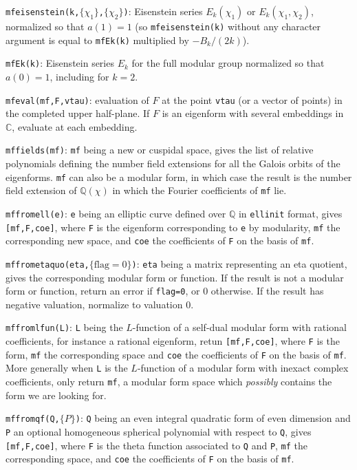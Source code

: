 \documentclass[11pt]{article}
\newcommand{\Q}{{\mathbb Q}}
\newcommand{\C}{{\mathbb C}}
\def\kbd#1{{\tt #1}}
\begin{document}
\f\kbd{mfeisenstein(k,$\{\chi_1\}$,$\{\chi_2\}$)}: Eisenstein series
$E_k(\chi_1)$ or
$E_k(\chi_1,\chi_2)$, normalized so that $a(1)=1$ (so \kbd{mfeisenstein(k)}
without any character argument is equal to \kbd{mfEk(k)} multiplied by
$-B_k/(2k)$).

\f\kbd{mfEk(k)}: Eisenstein series $E_k$ for the full modular group normalized
so that $a(0)=1$, including for $k=2$.

\f\kbd{mfeval(mf,F,vtau)}: evaluation of $F$ at the point \kbd{vtau} (or a
vector of points) in the completed upper half-plane. If $F$ is an eigenform
with several embeddings in $\C$, evaluate at each embedding.

\f\kbd{mffields(mf)}: \kbd{mf} being a new or cuspidal space, gives the list of
relative polynomials defining the number field extensions for all the Galois
orbits of the eigenforms. \kbd{mf} can also be a modular form, in which case
the result is the number field extension of $\Q(\chi)$ in which the Fourier
coefficients of \kbd{mf} lie.

\f\kbd{mffromell(e)}: \kbd{e} being an elliptic curve defined over $\Q$ in
\kbd{ellinit} format, gives \kbd{[mf,F,coe]}, where \kbd{F} is the eigenform
corresponding to \kbd{e} by modularity, \kbd{mf} the corresponding new space,
and \kbd{coe} the coefficients of \kbd{F} on the basis of \kbd{mf}.

\f\kbd{mffrometaquo(eta,$\{\text{flag}=0\}$)}: \kbd{eta} being a matrix
representing an eta quotient, gives the corresponding modular form or
function. If the result is not a modular form or function, return an error if
\kbd{flag=0}, or $0$ otherwise. If the result has negative valuation,
normalize to valuation $0$.

\f\kbd{mffromlfun(L)}: \kbd{L} being the $L$-function of a self-dual
modular form with rational coefficients, for instance a rational eigenform,
retun \kbd{[mf,F,coe]}, where \kbd{F} is the form, \kbd{mf} the corresponding
space and \kbd{coe} the coefficients of \kbd{F} on the basis of \kbd{mf}.
More generally when \kbd{L} is the $L$-function of a modular form with
inexact complex coefficients, only return \kbd{mf}, a modular form space
which \emph{possibly} contains the form we are looking for.

\f\kbd{mffromqf(Q,$\{P\}$)}: \kbd{Q} being an even integral quadratic form of
even dimension and \kbd{P} an optional homogeneous spherical polynomial with
respect to \kbd{Q}, gives \kbd{[mf,F,coe]}, where \kbd{F} is the theta
function associated to \kbd{Q} and \kbd{P}, \kbd{mf} the corresponding space,
and \kbd{coe} the coefficients of \kbd{F} on the basis of \kbd{mf}.
\end{document}
